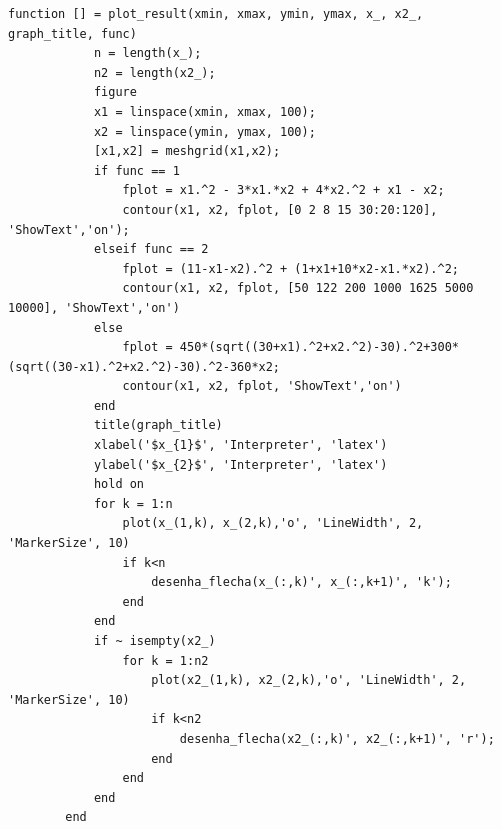 \documentclass[10pt, a4paper]{article}
\begin{document}
\begin{minipage}{\linewidth}
      \begin{lstlisting}[style=myStyle, caption=script plot\_result.m, label=list_plot_result]
      function [] = plot_result(xmin, xmax, ymin, ymax, x_, x2_, graph_title, func)
            n = length(x_);
            n2 = length(x2_);
            figure
            x1 = linspace(xmin, xmax, 100);
            x2 = linspace(ymin, ymax, 100);
            [x1,x2] = meshgrid(x1,x2);
            if func == 1
                fplot = x1.^2 - 3*x1.*x2 + 4*x2.^2 + x1 - x2;
                contour(x1, x2, fplot, [0 2 8 15 30:20:120], 'ShowText','on');
            elseif func == 2
                fplot = (11-x1-x2).^2 + (1+x1+10*x2-x1.*x2).^2;
                contour(x1, x2, fplot, [50 122 200 1000 1625 5000 10000], 'ShowText','on')
            else
                fplot = 450*(sqrt((30+x1).^2+x2.^2)-30).^2+300*(sqrt((30-x1).^2+x2.^2)-30).^2-360*x2;
                contour(x1, x2, fplot, 'ShowText','on')
            end
            title(graph_title)
            xlabel('$x_{1}$', 'Interpreter', 'latex')
            ylabel('$x_{2}$', 'Interpreter', 'latex')
            hold on
            for k = 1:n
                plot(x_(1,k), x_(2,k),'o', 'LineWidth', 2, 'MarkerSize', 10)
                if k<n
                    desenha_flecha(x_(:,k)', x_(:,k+1)', 'k');
                end
            end
            if ~ isempty(x2_)
                for k = 1:n2
                    plot(x2_(1,k), x2_(2,k),'o', 'LineWidth', 2, 'MarkerSize', 10)
                    if k<n2
                        desenha_flecha(x2_(:,k)', x2_(:,k+1)', 'r');
                    end
                end
            end
        end
      \end{lstlisting}
\end{minipage}
\end{document}
